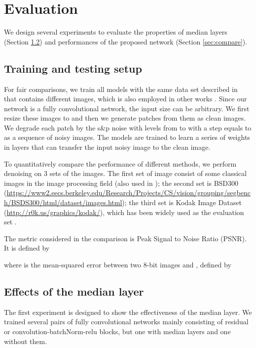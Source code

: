 \documentclass[journal]{IEEEtran}
\begin{document}
\section{Evaluation} \label{sec:eval}

We design several experiments to evaluate the properties of median layers (Section \ref{sec:effectMedian}) and performances of the proposed network (Section \ref{sec:compare}).

\subsection{Training and testing setup}

For fair comparisons, we train all models with the same data set described in \cite{Dong2015PAMI} that contains  different images, which is also employed in other works \cite{Fu2018Multimedia}. Since our network is a fully convolutional network, the input size can be arbitrary. We first resize these  images to  and then we generate  patches from them as clean images. We degrade each patch by the s\&p noise with levels from  to  with a step equals to  as a sequence of noisy images. The models are trained to learn a series of weights in layers that can transfer the input noisy image to the clean image.

To quantitatively compare the performance of different methods, we perform denoising on 3 sets of the images. The first set of image consist of some classical images in the image processing field (also used in \cite{Fu2018Multimedia}); the second set is BSD300 \cite{MartinFTM01} (\url{https://www2.eecs.berkeley.edu/Research/Projects/CS/vision/grouping/segbench/BSDS300/html/dataset/images.html}); the third set is Kodak Image Dataset (\url{http://r0k.us/graphics/kodak/}), which has been widely used as the evaluation set \cite{zhang2017beyond,zhang2018ffdnet,Lehtinen2018}.

The metric considered in the comparison is Peak Signal to Noise Ratio (PSNR). It is defined by

where  is the mean-squared error between two  8-bit images  and , defined by



\subsection{Effects of the median layer} \label{sec:effectMedian}

The first experiment is designed to show the effectiveness of the median layer. We trained several pairs of fully convolutional networks mainly consisting of residual or convolution-batchNorm-relu blocks, but one with median layers and one without them.
\end{document}
